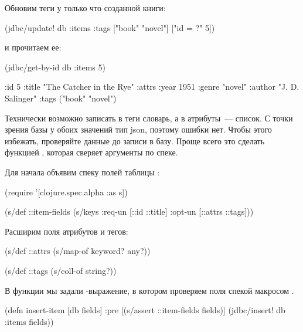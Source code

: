 Обновим теги у только что созданной книги:

\begin{english}
  \begin{clojure}
(jdbc/update! db :items
              {:tags ["book" "novel"]}
              ["id = ?" 5])
  \end{clojure}
\end{english}

и прочитаем ее:

\begin{english}
  \begin{clojure}
(jdbc/get-by-id db :items 5)

{:id 5
 :title "The Catcher in the Rye"
 :attrs {:year 1951 :genre "novel" :author "J. D. Salinger"}
 :tags ("book" "novel")}
  \end{clojure}
\end{english}

Технически возможно записать в теги словарь, а в атрибуты~--- список. С точки зрения базы у обоих значений тип json, поэтому ошибки нет. Чтобы этого избежать, проверяйте данные до записи в базу. Проще всего это сделать функцией , которая сверяет аргументы по спеке.

Для начала объявим спеку полей таблицы :

\begin{english}
  \begin{clojure}
(require '[clojure.spec.alpha :as s])

(s/def ::item-fields
  (s/keys :req-un [::id ::title]
          :opt-un [::attrs ::tags]))
  \end{clojure}
\end{english}

Расширим поля атрибутов и тегов:

\begin{english}
  \begin{clojure}
(s/def ::attrs
  (s/map-of keyword? any?))

(s/def ::tags
  (s/coll-of string?))
  \end{clojure}
\end{english}

В функции  мы задали -выражение, в котором проверяем поля спекой макросом .

\begin{english}
  \begin{clojure}
(defn insert-item [db fields]
  {:pre [(s/assert ::item-fields fields)]}
  (jdbc/insert! db :items fields))
  \end{clojure}
\end{english}

